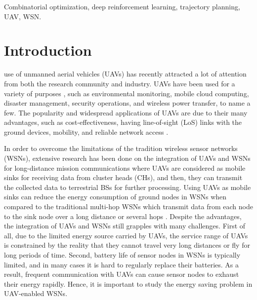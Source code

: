 \documentclass[journal]{IEEEtran}
\begin{document}
	\begin{IEEEkeywords}
		Combinatorial optimization, deep reinforcement learning, trajectory planning, UAV, WSN.
	\end{IEEEkeywords}
		
	\section{Introduction}\label{SecI}
	\label{sec:introduction}
	 use of unmanned aerial vehicles (UAVs) has recently attracted a lot of attention from both the research community and industry. UAVs have been used for a variety of purposes \cite{M. Mozaffari}, such as environmental monitoring, mobile cloud computing, disaster management, security operations, and wireless power transfer, to name a few. The popularity and widespread applications of UAVs are due to their many advantages, such as cost-effectiveness, having line-of-sight (LoS) links with the ground devices, mobility, and reliable network access \cite{Y. Zeng 2016}.
		
	In order to overcome the limitations of the tradition wireless sensor networks (WSNs), extensive research has been done on the integration of UAVs and WSNs for long-distance mission communications where UAVs are considered as mobile sinks for receiving data from cluster heads (CHs), and then, they can transmit the collected data to terrestrial BSs for further processing. Using UAVs as mobile sinks can reduce the energy consumption of ground nodes in WSNs when compared to the traditional multi-hop WSNs which transmit data from each node to the sink node over a long distance or several hops \cite{P. Nayak}. Despite the advantages, the integration of UAVs and WSNs still grapples with many challenges. First of all, due to the limited energy source carried by UAVs, the service range of UAVs is constrained by the reality that they cannot travel very long distances or fly for long periods of time. Second, battery life of sensor nodes in WSNs is typically limited, and in many cases it is hard to regularly replace their batteries. As a result, frequent communication with UAVs can cause sensor nodes to exhaust their energy rapidly. Hence, it is important to study the energy saving problem in UAV-enabled WSNs.
	
	
\end{document}
